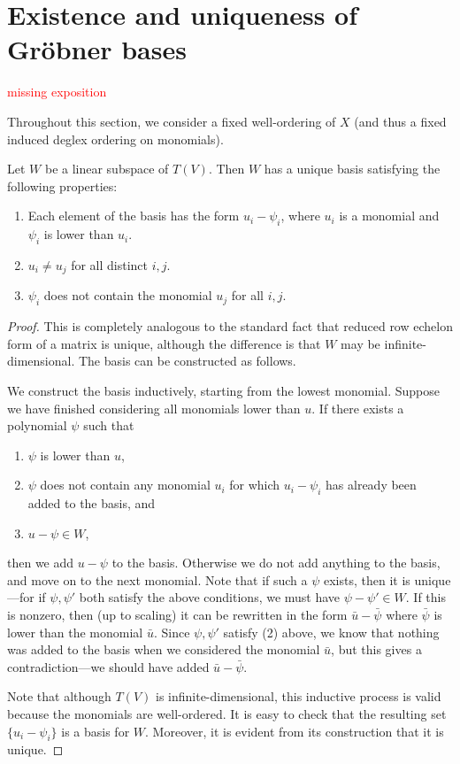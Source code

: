 \section{Existence and uniqueness of Gr\"obner bases}\label{sec:rref}
\textcolor{red}{missing exposition}

Throughout this section, we consider a fixed well-ordering of $X$ (and thus a fixed induced deglex ordering on monomials).

\begin{prop}\label{prop:rref}
	Let $W$ be a linear subspace of $T(V)$. Then $W$ has a unique basis satisfying the following properties:
	\begin{enumerate}
		\item Each element of the basis has the form $u_i - \psi_i$, where $u_i$ is a monomial and $\psi_i$ is lower than $u_i$.
		\item $u_i \neq u_j$ for all distinct $i,j$.
		\item $\psi_i$ does not contain the monomial $u_j$ for all $i,j$.
	\end{enumerate}
\end{prop}
\begin{proof}
	This is completely analogous to the standard fact that reduced row echelon form of a matrix is unique, although the difference is that $W$ may be infinite-dimensional. The basis can be constructed as follows.
	
	We construct the basis inductively, starting from the lowest monomial. Suppose we have finished considering all monomials lower than $u$. If there exists a polynomial $\psi$ such that
	\begin{enumerate}
		\item $\psi$ is lower than $u$,
		\item $\psi$ does not contain any monomial $u_i$ for which $u_i - \psi_i$ has already been added to the basis, and
		\item $u - \psi \in W$,
	\end{enumerate}
	then we add $u - \psi$ to the basis. Otherwise we do not add anything to the basis, and move on to the next monomial. Note that if such a $\psi$ exists, then it is unique---for if $\psi,\psi'$ both satisfy the above conditions, we must have $\psi - \psi' \in W$. If this is nonzero, then (up to scaling) it can be rewritten in the form $\bar{u} - \bar{\psi}$ where $\bar{\psi}$ is lower than the monomial $\bar{u}$. Since $\psi, \psi'$ satisfy (2) above, we know that nothing was added to the basis when we considered the monomial $\bar{u}$, but this gives a contradiction---we should have added $\bar{u}-\bar{\psi}$.
	
	Note that although $T(V)$ is infinite-dimensional, this inductive process is valid because the monomials are well-ordered. It is easy to check that the resulting set $\{u_i - \psi_i\}$ is a basis for $W$. Moreover, it is evident from its construction that it is unique.
\end{proof}

